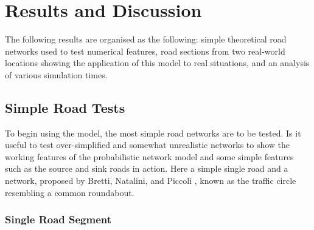 \chapter{Results and Discussion}
\label{ch:randd}
\graphicspath{{image_directory/resultsanddiscussion/}}

	The following results are organised as the following: simple theoretical road networks used to test numerical features, road sections from two real-world locations showing the application of this model to real situations, and an analysis of various simulation times. 
	
\section{Simple Road Tests}

	To begin using the model, the most simple road networks are to be tested. Is it useful to test over-simplified and somewhat unrealistic networks to show the working features of the probabilistic network model and some simple features such as the source and sink roads in action. Here a simple single road and a network, proposed by Bretti, Natalini, and Piccoli \cite{Bretti07}, known as the traffic circle resembling a common roundabout.
	
\subsection{Single Road Segment}
\label{randd:singleroad}

